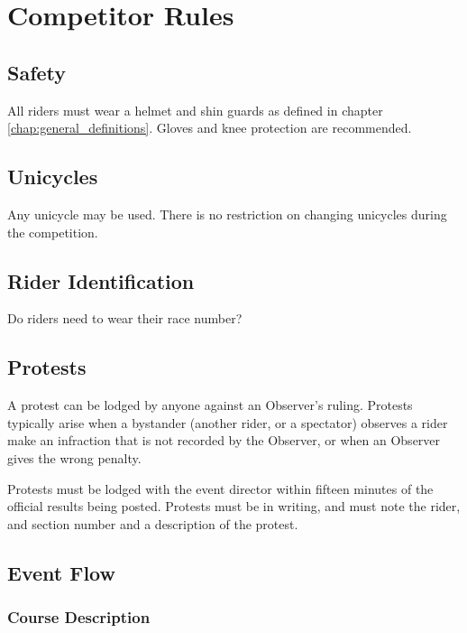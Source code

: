 \chapter{Competitor Rules}

\section{Safety}

All riders must wear a helmet and shin guards as defined in chapter \ref{chap:general_definitions}.
Gloves and knee protection are recommended.

\section{Unicycles}

Any unicycle may be used. 
There is no restriction on changing unicycles during the competition.

\section{Rider Identification}

\begin{framed}
Do riders need to wear their race number?
\end{framed}

\section{Protests}

A protest can be lodged by anyone against an Observer's ruling. 
Protests typically arise when a bystander (another rider, or a spectator) observes a rider make an infraction that is not recorded by the Observer, or when an Observer gives the wrong penalty.

Protests must be lodged with the event director within fifteen minutes of the official results being posted. 
Protests must be in writing, and must note the rider, and section number and a description of the protest.


\section{Event Flow}

\subsection{Course Description}

